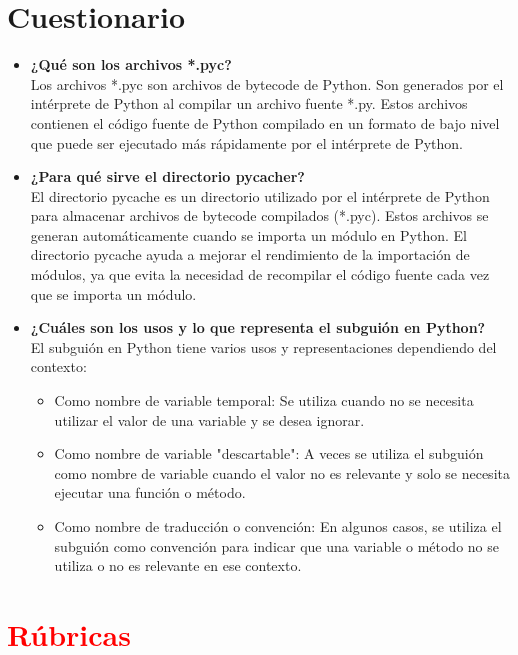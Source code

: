 \documentclass{article}
\begin{document}
	\section{Cuestionario}
\begin{itemize}
	\item \textbf{¿Qué son los archivos *.pyc?} \\
		Los archivos *.pyc son archivos de bytecode de Python. Son generados por el intérprete de Python al compilar un archivo fuente *.py. Estos archivos contienen el código fuente de Python compilado en un formato de bajo nivel que puede ser ejecutado más rápidamente por el intérprete de Python.

	\item \textbf{¿Para qué sirve el directorio pycacher?} \\
		El directorio pycache es un directorio utilizado por el intérprete de Python para almacenar archivos de bytecode compilados (*.pyc). Estos archivos se generan automáticamente cuando se importa un módulo en Python. El directorio pycache ayuda a mejorar el rendimiento de la importación de módulos, ya que evita la necesidad de recompilar el código fuente cada vez que se importa un módulo.

	\item \textbf{¿Cuáles son los usos y lo que representa el subguión en Python?} \\
		El subguión en Python tiene varios usos y representaciones dependiendo del contexto:
		\begin{itemize}
			\item Como nombre de variable temporal: Se utiliza cuando no se necesita utilizar el valor de una variable y se desea ignorar. 			
			\item Como nombre de variable "descartable": A veces se utiliza el subguión como nombre de variable cuando el valor no es relevante y solo se necesita ejecutar una función o método. 		
			\item Como nombre de traducción o convención: En algunos casos, se utiliza el subguión como convención para indicar que una variable o método no se utiliza o no es relevante en ese contexto. 
		\end{itemize}
\end{itemize}
	\clearpage
	
	
	\section{\textcolor{red}{Rúbricas}}
	
\end{document}
